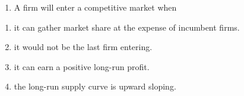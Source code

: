 \documentclass[11pt,]{article}
\providecommand{\tightlist}{%
  \setlength{\itemsep}{0pt}\setlength{\parskip}{0pt}}
\begin{document}
\begin{enumerate}
\def\labelenumi{\arabic{enumi})}
\setcounter{enumi}{19}
\tightlist
\item
  A firm will enter a competitive market when
\end{enumerate}

\begin{enumerate}
\def\labelenumi{\Alph{enumi})}
\tightlist
\item
  it can gather market share at the expense of incumbent firms.
\item
  it would not be the last firm entering.
\item
  it can earn a positive long-run profit.
\item
  the long-run supply curve is upward sloping.
\end{enumerate}
\end{document}
